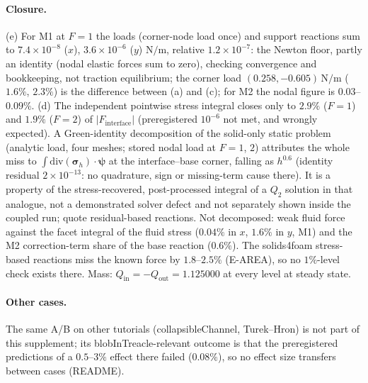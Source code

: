 \documentclass[sn-mathphys,Numbered]{sn-jnl}
\begin{document}
\paragraph{Closure.}
(e) For M1 at $F=1$ the loads (corner-node load once) and support reactions sum to $7.4\times10^{-8}$ ($x$), $3.6\times10^{-6}$ ($y$) $\mathrm{N/m}$, relative $1.2\times10^{-7}$: the Newton floor, partly an identity (nodal elastic forces sum to zero), checking convergence and bookkeeping, not traction equilibrium; the corner load $(0.258,-0.605)\,\mathrm{N/m}$ ($1.6\%$, $2.3\%$) is the difference between (a) and (c); for M2 the nodal figure is $0.03$--$0.09\%$.
(d) The independent pointwise stress integral closes only to $2.9\%$ ($F=1$) and $1.9\%$ ($F=2$) of $|F_\mathrm{interface}|$ (preregistered $10^{-6}$ not met, and wrongly expected). A Green-identity decomposition of the solid-only static problem (analytic load, four meshes; stored nodal load at $F=1$, $2$) attributes the whole miss to $\int\mathrm{div}(\bm\sigma_h)\cdot\bm\psi$ at the interface--base corner, falling as $h^{0.6}$ (identity residual $2\times10^{-13}$: no quadrature, sign or missing-term cause there). It is a property of the stress-recovered, post-processed integral of a $Q_2$ solution in that analogue, not a demonstrated solver defect and not separately shown inside the coupled run; quote residual-based reactions. Not decomposed: weak fluid force against the facet integral of the fluid stress ($0.04\%$ in $x$, $1.6\%$ in $y$, M1) and the M2 correction-term share of the base reaction ($0.6\%$).
The solids4foam stress-based reactions miss the known force by $1.8$--$2.5\%$ (E-AREA), so no $1\%$-level check exists there. Mass: $Q_\mathrm{in}=-Q_\mathrm{out}=1.125000$ at every level at steady state.

\paragraph{Other cases.} The same A/B on other tutorials (collapsibleChannel, Turek--Hron) is not part of this supplement; its blobInTreacle-relevant outcome is that the preregistered predictions of a $0.5$--$3\%$ effect there failed ($0.08\%$), so no effect size transfers between cases (README).
\end{document}

